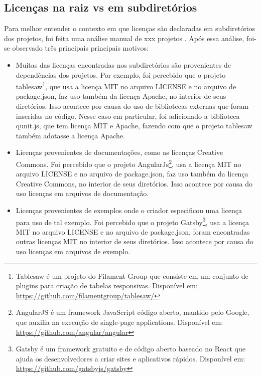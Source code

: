 \subsection{Licenças na raiz vs em subdiretórios} 

Para melhor entender o contexto em que licenças são declaradas em subdiretórios dos projetos, foi feita uma análise manual de xxx projetos . Após essa análise, foi-se observado três principais principais motivos:

 \begin{itemize}
   \item Muitas das licenças encontradas nos subdiretórios são provenientes de dependências dos projetos. %
   Por exemplo, foi percebido que o projeto tablesaw\footnote{Tablesaw é um projeto do Filament Group que consiste em um conjunto de plugins para criação de tabelas responsivas. Disponível em: \url{https://github.com/filamentgroup/tablesaw/}}, que usa a licença MIT no arquivo LICENSE e no arquivo de package.json, faz uso também da licença Apache, no interior de seus diretórios. Isso acontece por causa do uso de bibliotecas externas que foram inseridas no código. Nesse caso em particular, foi adicionado a biblioteca qunit.js, que tem licença MIT e Apache, fazendo com que o projeto tablesaw também adotasse a licença Apache.
   
   \item Licenças provenientes de documentações, como as licenças Creative Commons. Foi percebido que o projeto AngularJs\footnote{AngularJS é um framework JavaScript código aberto, mantido pelo Google, que auxilia na execução de single-page applications. Disponível em: \url{https://github.com/angular/angular}}, usa a licença MIT no arquivo LICENSE e no arquivo de package.json, faz uso também da licença Creative Commons, no interior de seus diretórios. Isso acontece por causa do uso licenças em arquivos de documentação. 
   
   \item Licenças provenientes de exemplos onde o criador especificou uma licença para uso de tal exemplo. Foi percebido que o projeto Gatsby\footnote{Gatsby é um framework gratuito e de código aberto baseado no React que ajuda os desenvolvedores a criar sites e aplicativos rápidos. Disponível em: \url{https://github.com/gatsbyjs/gatsby}}, usa a licença MIT no arquivo LICENSE e no arquivo de package.json, foram encontradas outras licenças MIT no interior de seus diretórios. Isso acontece por causa do uso licenças em arquivos de exemplo. 
 \end{itemize}

